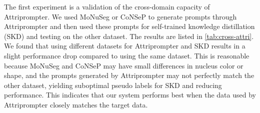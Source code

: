 \documentclass[journal,twoside,web]{ieeecolor}
\begin{document}
\begin{table}[t]
\caption{Validation of the cross-domain capacity of Attriprompter.}
\label{tab:cross-attri}
\begin{center}
\end{center}
\vskip -0.15in
\end{table}

The first experiment is a validation of the cross-domain capacity of Attriprompter. We used MoNuSeg or CoNSeP to generate prompts through Attriprompter and then used these prompts for self-trained knowledge distillation (SKD) and testing on the other dataset. The results are listed in \autoref{tab:cross-attri}. We found that using different datasets for Attriprompter and SKD results in a slight performance drop compared to using the same dataset. This is reasonable because MoNuSeg and CoNSeP may have small differences in nucleus color or shape, and the prompts generated by Attriprompter may not perfectly match the other dataset, yielding suboptimal pseudo labels for SKD and reducing performance. This indicates that our system performs best when the data used by Attriprompter closely matches the target data.
\end{document}
